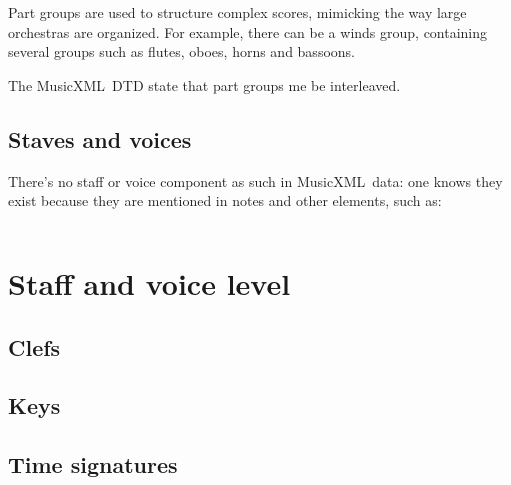 \documentclass[12pt,a4paper]{article}
\newcommand{\mxml}{MusicXML}
\begin{document}
Part groups are used to structure complex scores, mimicking the way large orchestras are organized. For example, there can be a winds group, containing several groups such as flutes, oboes, horns and bassoons.

The \mxml\ DTD state that part groups me be interleaved.

\subsection{Staves and voices}

There's no staff or voice component as such in \mxml\ data: one knows they exist because they are mentioned in notes and other elements, such as:
\begin{lstlisting}[language=XML]

\end{lstlisting}

\section{Staff and voice level}

\subsection{Clefs}

 

\subsection{Keys}

 

\subsection{Time signatures}
\end{document}
